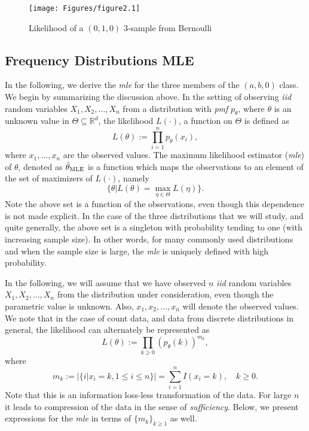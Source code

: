 \documentclass[]{book}
\theoremstyle{definition}
\theoremstyle{definition}
\theoremstyle{definition}
\theoremstyle{remark}
\begin{document}
\begin{figure}

{\centering \texttt{[image: Figures/figure2.1]} 

}

\caption{Likelihood of a $(0,1,0)$ $3$-sample from Bernoulli}\label{fig:berlik}
\end{figure}

\subsection{Frequency Distributions
MLE}\label{S:frequency-distributions-mle}

In the following, we derive the \emph{mle} for the three members of the
\((a,b,0)\) class. We begin by summarizing the discussion above. In the
setting of observing \emph{iid} random variables \(X_1,X_2,\ldots,X_n\)
from a distribution with \emph{pmf} \(p_\theta\), where \(\theta\) is an
unknown value in \(\Theta\subseteq \mathbb{R}^d\), the likelihood
\(L(\cdot)\), a function on \(\Theta\) is defined as \[
L(\theta):=\prod_{i=1}^n p_\theta(x_i),
\] where \(x_1,\ldots,x_n\) are the observed values. The maximum
likelihood estimator (\emph{mle}) of \(\theta\), denoted as
\(\hat{\theta}_{\rm MLE}\) is a function which maps the observations to
an element of the set of maximizers of \(L(\cdot)\), namely \[
\{\theta \vert L(\theta)=\max_{\eta\in\Theta}L(\eta)\}.
\] Note the above set is a function of the observations, even though
this dependence is not made explicit. In the case of the three
distributions that we will study, and quite generally, the above set is
a singleton with probability tending to one (with increasing sample
size). In other words, for many commonly used distributions and when the
sample size is large, the \emph{mle} is uniquely defined with high
probability.

In the following, we will assume that we have observed \(n\) \emph{iid}
random variables \(X_1,X_2,\ldots,X_n\) from the distribution under
consideration, even though the parametric value is unknown. Also,
\(x_1,x_2,\ldots,x_n\) will denote the observed values. We note that in
the case of count data, and data from discrete distributions in general,
the likelihood can alternately be represented as \[
L(\theta):=\prod_{k\geq 0} \left(p_\theta(k)\right)^{m_k},
\] where \[
m_k:= \left\vert \{i\vert x_i=k, 1\leq i \leq n\} \right\vert=\sum_{i= 1}^n I(x_i=k), \quad k\geq 0.
\] Note that this is an information loss-less transformation of the
data. For large \(n\) it leads to compression of the data in the sense
of \emph{sufficiency}. Below, we present expressions for the \emph{mle}
in terms of \(\{m_k\}_{k\geq 1}\) as well.
\end{document}
